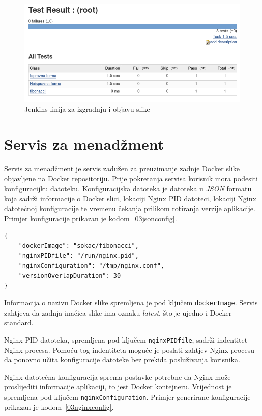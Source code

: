 \begin{figure}[h]
    \centering
    \includegraphics[width=\textwidth]{img/03/jenkins_result.png}
    \caption{Jenkins linija za izgradnju i objavu slike}%
    \label{fig:03jenkins_result}
\end{figure}

\section{Servis za menadžment}
Servis za menadžment je servis zadužen za preuzimanje zadnje Docker slike objavljene na Docker
repositoriju. Prije pokretanja servisa korisnik mora podesiti konfiguracijku datoteku.
Konfiguracijska datoteka je datoteka u \textit{JSON} formatu koja sadrži informacije o Docker slici,
lokaciji Nginx PID datoteci, lokaciji Nginx datotečnoj konfiguracije te vremenu čekanja prilikom
rotiranja verzije aplikacije. Primjer konfiguracije prikazan je kodom~\ref{03jsonconfig}.

\begin{lstlisting}[float=h]
{
    "dockerImage": "sokac/fibonacci",
    "nginxPIDfile": "/run/nginx.pid",
    "nginxConfiguration": "/tmp/nginx.conf",
    "versionOverlapDuration": 30
}

\end{lstlisting}

Informacija o nazivu Docker slike spremljena je pod ključem \texttt{dockerImage}. Servis
zahtjeva da zadnja inačica slike ima oznaku \textit{latest}, što je ujedno i Docker standard.

Nginx PID datoteka, spremljena pod ključem \texttt{nginxPIDfile}, sadrži indentitet Nginx procesa.
Pomoću tog indentiteta moguće je poslati zahtjev Nginx procesu da ponovno učita konfiguracije
datoteke bez prekida posluživanja korisnika.

Nginx datotečna konfiguracija sprema postavke potrebne da Nginx može proslijediti informacije
aplikaciji, to jest Docker kontejneru. Vrijednost je spremljena pod ključem
\texttt{nginxConfiguration}. Primjer generirane konfiguracije prikazan je
kodom~\ref{03nginxconfig}.

